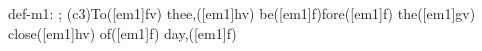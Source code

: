 def-m1: \grealign;
(c3)To([em1]fv) thee,([em1]hv) be([em1]f)fore([em1]f) the([em1]gv) close([em1]hv) of([em1]f) day,([em1]f)